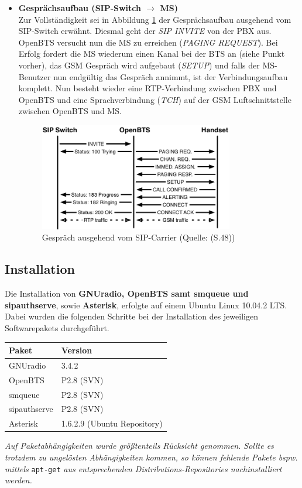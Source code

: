 \begin{itemize}
\item \textbf{Gesprächsaufbau (SIP-Switch $\rightarrow$ MS)}\\
Zur Vollständigkeit sei in Abbildung \ref{fig:openbts_call_carrierside} der Gesprächsaufbau ausgehend vom SIP-Switch erwähnt. Diesmal geht der \textit{SIP INVITE} von der PBX aus. OpenBTS versucht nun die MS zu erreichen (\textit{PAGING REQUEST}). Bei Erfolg fordert die MS wiederum einen Kanal bei der BTS an (siehe Punkt vorher), das GSM Gespräch wird aufgebaut (\textit{SETUP}) und falls der MS-Benutzer nun endgültig das Gespräch annimmt, ist der Verbindungsaufbau komplett. Nun besteht wieder eine RTP-Verbindung zwischen PBX und OpenBTS und eine Sprachverbindung (\textit{TCH}) auf der GSM Luftschnittstelle zwischen OpenBTS und MS. 
\begin{figure}[h]
	\centering
		\includegraphics[width=0.80\textwidth]{img/openbts_call_carrierside.png}
	\caption{Gespräch ausgehend vom SIP-Carrier (Quelle: \cite{bib:openbtsmanual}(S.48))}
	\label{fig:openbts_call_carrierside}
\end{figure}
\end{itemize}

\subsection{Installation}
\label{sec:Installation}
Die Installation von \textbf{GNUradio, OpenBTS samt smqueue und sipauthserve}, sowie \textbf{Asterisk}, erfolgte auf einem Ubuntu Linux 10.04.2 LTS. Dabei wurden die folgenden Schritte bei der Installation des jeweiligen Softwarepakets durchgeführt.\\

\begin{center}
\begin{tabular}{l|l}
\textbf{Paket} & \textbf{Version}\\
\hline 
GNUradio & 3.4.2\\
OpenBTS & P2.8 (SVN)\\
smqueue & P2.8 (SVN)\\
sipauthserve & P2.8 (SVN)\\
Asterisk & 1.6.2.9 (Ubuntu Repository)\\
\end{tabular}
\end{center}
\textit{Auf Paketabhängigkeiten wurde größtenteils Rücksicht genommen. Sollte es trotzdem zu ungelösten Abhängigkeiten kommen, so können fehlende Pakete bspw. mittels} \verb|apt-get| \textit{aus entsprechenden Distributions-Repositories nachinstalliert werden.}

